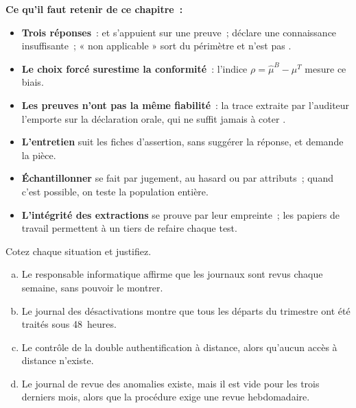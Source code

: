 \separateur

\begin{boxresume}
\textbf{Ce qu'il faut retenir de ce chapitre~:}
\begin{itemize}
    \item \textbf{Trois réponses}~: \OUI{} et \NON{} s'appuient sur une
          preuve~; \NEK{} déclare une connaissance insuffisante~; « non
          applicable » sort du périmètre et n'est pas \NEK{}.
    \item \textbf{Le choix forcé surestime la conformité}~: l'indice
          $\rho = \hat{\mu}^{B} - \mu^{T}$ mesure ce biais.
    \item \textbf{Les preuves n'ont pas la même fiabilité}~: la trace extraite
          par l'auditeur l'emporte sur la déclaration orale, qui ne suffit
          jamais à coter \OUI{}.
    \item \textbf{L'entretien} suit les fiches d'assertion, sans suggérer la
          réponse, et demande la pièce.
    \item \textbf{Échantillonner} se fait par jugement, au hasard ou par
          attributs~; quand c'est possible, on teste la population entière.
    \item \textbf{L'intégrité des extractions} se prouve par leur empreinte~;
          les papiers de travail permettent à un tiers de refaire chaque test.
\end{itemize}
\end{boxresume}

\bigskip

\begin{boxexo}[title={\ding{45}\quad Exercice~8.1. OUI, NON, NEK ou non applicable~? \niveaubase}]
Cotez chaque situation et justifiez.
\begin{enumerate}[(a)]
    \item Le responsable informatique affirme que les journaux sont revus
          chaque semaine, sans pouvoir le montrer.
    \item Le journal des désactivations montre que tous les départs du
          trimestre ont été traités sous 48~heures.
    \item Le contrôle de la double authentification à distance, alors
          qu'aucun accès à distance n'existe.
    \item Le journal de revue des anomalies existe, mais il est vide pour
          les trois derniers mois, alors que la procédure exige une revue
          hebdomadaire.
\end{enumerate}
\end{boxexo}

